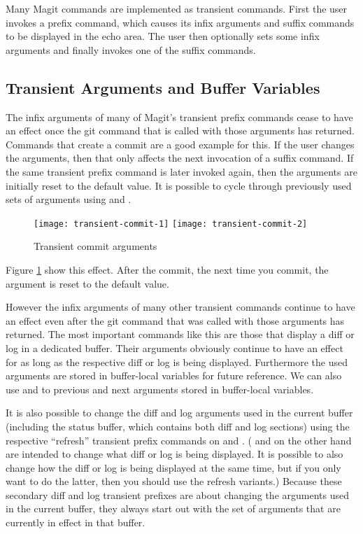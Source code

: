 Many Magit commands are implemented as transient commands.
First the user invokes a prefix command, which causes its infix arguments and suffix commands to be displayed in the echo area.
The user then optionally sets some infix arguments and finally invokes one of the suffix commands.


\subsection{Transient Arguments and Buffer Variables}
\label{sec:trans-argum-buff}

The infix arguments of many of Magit’s transient prefix commands cease to have an effect once the git command that is called with those arguments has returned.
Commands that create a commit are a good example for this.
If the user changes the arguments, then that only affects the next invocation of a suffix command.
If the same transient prefix command is later invoked again, then the arguments are initially reset to the default value.
It is possible to cycle through previously used sets of arguments using  and .

\begin{figure}[!htbp]
  \centering
  \texttt{[image: transient-commit-1]}
  \texttt{[image: transient-commit-2]}
  \caption{Transient commit arguments}
  \label{fig:transient-commit-arguments}
\end{figure}


Figure \ref{fig:transient-commit-arguments} show this effect.
After the commit, the next time you commit, the argument is reset to the default value.


However the infix arguments of many other transient commands continue to have an effect even after the git command that was called with those arguments has returned.
The most important commands like this are those that display a diff or log in a dedicated buffer.
Their arguments obviously continue to have an effect for as long as the respective diff or log is being displayed.
Furthermore the used arguments are stored in buffer-local variables for future reference.
We can also use  and  to previous and next arguments stored in buffer-local variables.


It is also possible to change the diff and log arguments used in the current buffer (including the status buffer, which contains both diff and log sections) using the respective ``refresh'' transient prefix commands on  and .
( and  on the other hand are intended to change what diff or log is being displayed.
It is possible to also change how the diff or log is being displayed at the same time, but if you only want to do the latter, then you should use the refresh variants.)
Because these secondary diff and log transient prefixes are about changing the arguments used in the current buffer, they always start out with the set of arguments that are currently in effect in that buffer.

